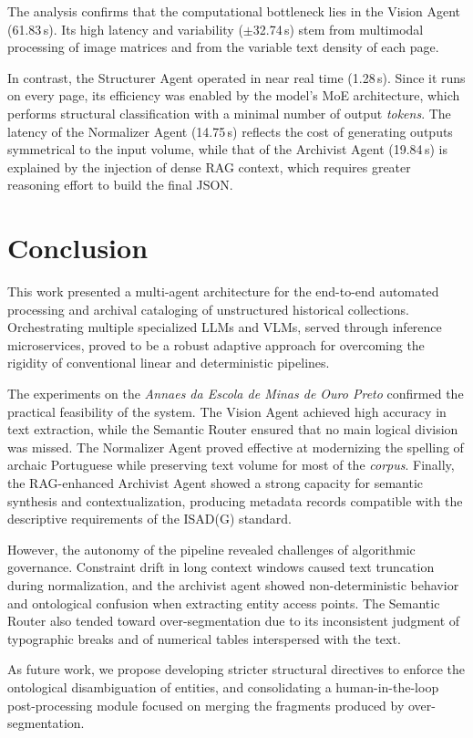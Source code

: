 \documentclass[conference]{IEEEtran}
\begin{document}
The analysis confirms that the computational bottleneck lies in the Vision Agent (61.83\,s). Its high latency and variability ($\pm$32.74\,s) stem from multimodal processing of image matrices and from the variable text density of each page.

In contrast, the Structurer Agent operated in near real time (1.28\,s). Since it runs on every page, its efficiency was enabled by the model's MoE architecture, which performs structural classification with a minimal number of output \textit{tokens}. The latency of the Normalizer Agent (14.75\,s) reflects the cost of generating outputs symmetrical to the input volume, while that of the Archivist Agent (19.84\,s) is explained by the injection of dense RAG context, which requires greater reasoning effort to build the final JSON.

\section{Conclusion}

This work presented a multi-agent architecture for the end-to-end automated processing and archival cataloging of unstructured historical collections. Orchestrating multiple specialized LLMs and VLMs, served through inference microservices, proved to be a robust adaptive approach for overcoming the rigidity of conventional linear and deterministic pipelines.

The experiments on the \textit{Annaes da Escola de Minas de Ouro Preto} confirmed the practical feasibility of the system. The Vision Agent achieved high accuracy in text extraction, while the Semantic Router ensured that no main logical division was missed. The Normalizer Agent proved effective at modernizing the spelling of archaic Portuguese while preserving text volume for most of the \textit{corpus}. Finally, the RAG-enhanced Archivist Agent showed a strong capacity for semantic synthesis and contextualization, producing metadata records compatible with the descriptive requirements of the ISAD(G) standard.

However, the autonomy of the pipeline revealed challenges of algorithmic governance. Constraint drift in long context windows caused text truncation during normalization, and the archivist agent showed non-deterministic behavior and ontological confusion when extracting entity access points. The Semantic Router also tended toward over-segmentation due to its inconsistent judgment of typographic breaks and of numerical tables interspersed with the text.

As future work, we propose developing stricter structural directives to enforce the ontological disambiguation of entities, and consolidating a human-in-the-loop post-processing module focused on merging the fragments produced by over-segmentation.


\end{document}
